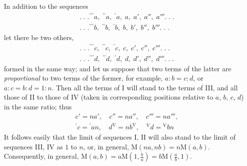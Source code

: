 In addition to the sequences
\[
\begin{array}{l}
.\;.\;.{}^{\prime\prime\prime}a,\;{}^{\prime\prime}a,\;{}^{\prime}a,\; a,\; a',\; a'',\; a'''.\;.\;.\\[6pt]
.\;.\;.{}^{\prime\prime\prime}b,\;{}^{\prime\prime}b,\;{}^{\prime}b,\; b,\; b',\; b'',\; b'''.\;.\;.
\end{array}
\]
let there be two others,
\[
\begin{array}{l}
.\;.\;.{}^{\prime\prime\prime}c,\;{}^{\prime\prime}c,\;{}^{\prime}c,\; c,\; c',\; c'',\; c'''.\;.\;.\\[6pt]
.\;.\;.{}^{\prime\prime\prime}d,\;{}^{\prime\prime}d,\;{}^{\prime}d,\; d,\; d',\; d'',\; d'''.\;.\;.
\end{array}
\]
formed in the same way; and let us suppose that two terms of the latter are
\textit{proportional} to two terms of the former, for example, $a:b=c:d$, or $a:c=b:d=1:n$.
Then all the terms of I will stand to the terms of III, and all those of II to those of IV
(taken in corresponding positions relative to $a$, $b$, $c$, $d$) in the same ratio; thus
\[
\begin{gathered}c'=na',\quad c''=na'',\quad c'''=na''',\\ {}^{\prime}c={}^{\prime}an,\quad d^{\mathrm V}=nb^{\mathrm V},\quad{}^{\mathrm V}d={}^{\mathrm V}bn\end{gathered}
\]
It follows easily that the limit of sequences I, II will also stand to the limit of sequences
III, IV as $1$ to $n$, or, in general, $\mathrm M(na,nb)=n\mathrm M(a,b)$.
Consequently, in general, $\mathrm M(a,b)=a\mathrm M(1,\frac{b}{a})=b\mathrm M(\frac{a}{b},1)$.

\clearpage
\endgroup
